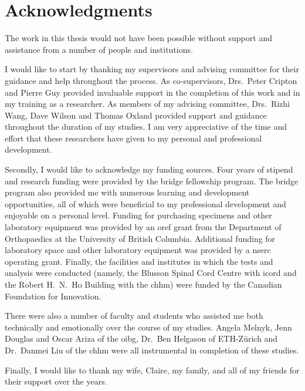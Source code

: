 
\chapter{Acknowledgments}
The work in this thesis would not have been possible without support and assistance from a number of people and institutions.

I would like to start by thanking my supervisors and advising committee for their guidance and help throughout the process.
As co-supervisors, Drs.~Peter Cripton and Pierre Guy provided invaluable support in the completion of this work and in my training as a researcher.
As members of my advising committee, Drs.~Rizhi Wang, Dave Wilson and Thomas Oxland provided support and guidance throughout the duration of my studies.
I am very appreciative of the time and effort that these researchers have given to my personal and professional development.

Secondly, I would like to acknowledge my funding sources.
Four years of stipend and research funding were provided by the \ac{bridge} fellowship program.
The \ac{bridge} program also provided me with numerous learning and development opportunities, all of which were beneficial to my professional development and enjoyable on a personal level.
Funding for purchasing specimens and other laboratory equipment was provided by an \ac{oref} grant from the Department of Orthopaedics at the University of British Columbia.
Additional funding for laboratory space and other laboratory equipment was provided by a \acf{nserc} operating grant.
Finally, the facilities and institutes in which the tests and analysis were conducted (namely, the Blusson Spinal Cord Centre with \acs{icord} and the Robert H.\ N.\ Ho Building with the \acs{chhm}) were funded by the Canadian Foundation for Innovation.

There were also a number of faculty and students who assisted me both technically and emotionally over the course of my studies.
Angela Melnyk, Jenn Douglas and Oscar Ariza of the \ac{oibg}, Dr.\ Ben Helgason of ETH-Z\"{u}rich and Dr.\ Danmei Liu of the \ac{chhm} were all instrumental in completion of these studies.

Finally, I would like to thank my wife, Claire, my family, and all of my friends for their support over the years.
